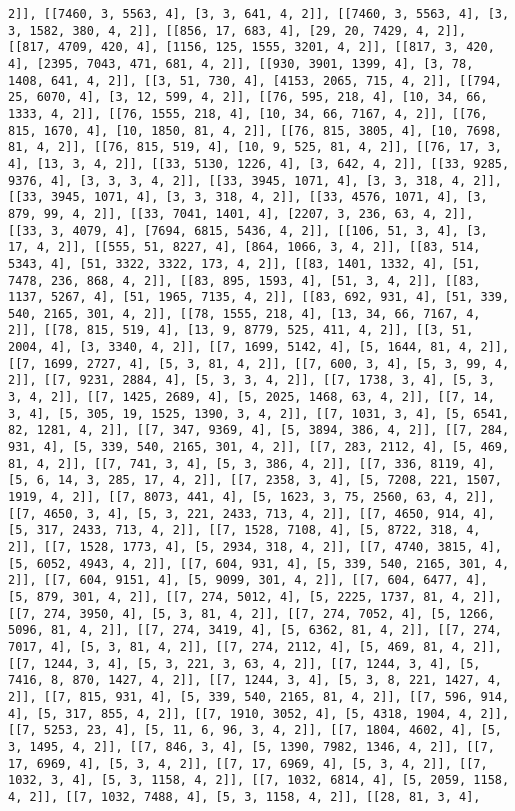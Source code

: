 \documentclass[12pt,fleqn]{article}\usepackage{../../common}
\begin{document}
\begin{verbatim}
2]], [[7460, 3, 5563, 4], [3, 3, 641, 4, 2]], [[7460, 3, 5563, 4], [3, 3, 1582, 380, 4, 2]], [[856, 17, 683, 4], [29, 20, 7429, 4, 2]], [[817, 4709, 420, 4], [1156, 125, 1555, 3201, 4, 2]], [[817, 3, 420, 4], [2395, 7043, 471, 681, 4, 2]], [[930, 3901, 1399, 4], [3, 78, 1408, 641, 4, 2]], [[3, 51, 730, 4], [4153, 2065, 715, 4, 2]], [[794, 25, 6070, 4], [3, 12, 599, 4, 2]], [[76, 595, 218, 4], [10, 34, 66, 1333, 4, 2]], [[76, 1555, 218, 4], [10, 34, 66, 7167, 4, 2]], [[76, 815, 1670, 4], [10, 1850, 81, 4, 2]], [[76, 815, 3805, 4], [10, 7698, 81, 4, 2]], [[76, 815, 519, 4], [10, 9, 525, 81, 4, 2]], [[76, 17, 3, 4], [13, 3, 4, 2]], [[33, 5130, 1226, 4], [3, 642, 4, 2]], [[33, 9285, 9376, 4], [3, 3, 3, 4, 2]], [[33, 3945, 1071, 4], [3, 3, 318, 4, 2]], [[33, 3945, 1071, 4], [3, 3, 318, 4, 2]], [[33, 4576, 1071, 4], [3, 879, 99, 4, 2]], [[33, 7041, 1401, 4], [2207, 3, 236, 63, 4, 2]], [[33, 3, 4079, 4], [7694, 6815, 5436, 4, 2]], [[106, 51, 3, 4], [3, 17, 4, 2]], [[555, 51, 8227, 4], [864, 1066, 3, 4, 2]], [[83, 514, 5343, 4], [51, 3322, 3322, 173, 4, 2]], [[83, 1401, 1332, 4], [51, 7478, 236, 868, 4, 2]], [[83, 895, 1593, 4], [51, 3, 4, 2]], [[83, 1137, 5267, 4], [51, 1965, 7135, 4, 2]], [[83, 692, 931, 4], [51, 339, 540, 2165, 301, 4, 2]], [[78, 1555, 218, 4], [13, 34, 66, 7167, 4, 2]], [[78, 815, 519, 4], [13, 9, 8779, 525, 411, 4, 2]], [[3, 51, 2004, 4], [3, 3340, 4, 2]], [[7, 1699, 5142, 4], [5, 1644, 81, 4, 2]], [[7, 1699, 2727, 4], [5, 3, 81, 4, 2]], [[7, 600, 3, 4], [5, 3, 99, 4, 2]], [[7, 9231, 2884, 4], [5, 3, 3, 4, 2]], [[7, 1738, 3, 4], [5, 3, 3, 4, 2]], [[7, 1425, 2689, 4], [5, 2025, 1468, 63, 4, 2]], [[7, 14, 3, 4], [5, 305, 19, 1525, 1390, 3, 4, 2]], [[7, 1031, 3, 4], [5, 6541, 82, 1281, 4, 2]], [[7, 347, 9369, 4], [5, 3894, 386, 4, 2]], [[7, 284, 931, 4], [5, 339, 540, 2165, 301, 4, 2]], [[7, 283, 2112, 4], [5, 469, 81, 4, 2]], [[7, 741, 3, 4], [5, 3, 386, 4, 2]], [[7, 336, 8119, 4], [5, 6, 14, 3, 285, 17, 4, 2]], [[7, 2358, 3, 4], [5, 7208, 221, 1507, 1919, 4, 2]], [[7, 8073, 441, 4], [5, 1623, 3, 75, 2560, 63, 4, 2]], [[7, 4650, 3, 4], [5, 3, 221, 2433, 713, 4, 2]], [[7, 4650, 914, 4], [5, 317, 2433, 713, 4, 2]], [[7, 1528, 7108, 4], [5, 8722, 318, 4, 2]], [[7, 1528, 1773, 4], [5, 2934, 318, 4, 2]], [[7, 4740, 3815, 4], [5, 6052, 4943, 4, 2]], [[7, 604, 931, 4], [5, 339, 540, 2165, 301, 4, 2]], [[7, 604, 9151, 4], [5, 9099, 301, 4, 2]], [[7, 604, 6477, 4], [5, 879, 301, 4, 2]], [[7, 274, 5012, 4], [5, 2225, 1737, 81, 4, 2]], [[7, 274, 3950, 4], [5, 3, 81, 4, 2]], [[7, 274, 7052, 4], [5, 1266, 5096, 81, 4, 2]], [[7, 274, 3419, 4], [5, 6362, 81, 4, 2]], [[7, 274, 7017, 4], [5, 3, 81, 4, 2]], [[7, 274, 2112, 4], [5, 469, 81, 4, 2]], [[7, 1244, 3, 4], [5, 3, 221, 3, 63, 4, 2]], [[7, 1244, 3, 4], [5, 7416, 8, 870, 1427, 4, 2]], [[7, 1244, 3, 4], [5, 3, 8, 221, 1427, 4, 2]], [[7, 815, 931, 4], [5, 339, 540, 2165, 81, 4, 2]], [[7, 596, 914, 4], [5, 317, 855, 4, 2]], [[7, 1910, 3052, 4], [5, 4318, 1904, 4, 2]], [[7, 5253, 23, 4], [5, 11, 6, 96, 3, 4, 2]], [[7, 1804, 4602, 4], [5, 3, 1495, 4, 2]], [[7, 846, 3, 4], [5, 1390, 7982, 1346, 4, 2]], [[7, 17, 6969, 4], [5, 3, 4, 2]], [[7, 17, 6969, 4], [5, 3, 4, 2]], [[7, 1032, 3, 4], [5, 3, 1158, 4, 2]], [[7, 1032, 6814, 4], [5, 2059, 1158, 4, 2]], [[7, 1032, 7488, 4], [5, 3, 1158, 4, 2]], [[28, 81, 3, 4], 
\end{verbatim}
\end{document}
